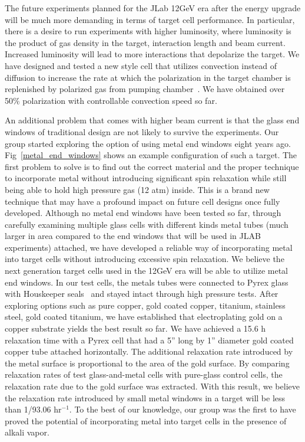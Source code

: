 The future experiments planned for the JLab 12GeV era after the energy upgrade will be much more demanding in terms of target cell performance. In particular, there is a desire to run experiments with higher luminosity, where luminosity is the product of gas density in the target, interaction length and beam current. Increased luminosity will lead to more interactions that depolarize the target. We have designed and tested a new style cell that utilizes convection instead of diffusion to increase the rate at which the polarization in the target chamber is replenished by polarized gas from pumping chamber~\cite{PhysRevC.84.065201}. We have obtained over 50\% polarization with controllable convection speed so far.

An additional problem that comes with higher beam current is that the glass end windows of traditional design are not likely to survive the experiments. Our group started exploring the option of using metal end windows eight years ago. Fig~\ref{metal_end_windows} shows an example configuration of such a target. The first problem to solve is to find out the correct material and the proper technique to incorporate metal without introducing significant spin relaxation while still being able to hold high pressure gas (12 atm) inside. This is a brand new technique that may have a profound impact on future cell designs once fully developed. Although no metal end windows have been tested so far, through carefully examining multiple glass cells with different kinds metal tubes (much larger in area compared to the end windows that will be used in JLAB experiments) attached, we have developed a reliable way of incorporating metal into target cells without introducing excessive spin relaxation. We believe the next generation target cells used in the 12GeV era will be able to utilize metal end windows. In our test cells, the metals tubes were connected to Pyrex glass with Houskeeper seals~\cite{Houskeeper} and stayed intact through high pressure tests. After exploring options such as pure copper, gold coated copper, titanium, stainless steel, gold coated titanium, we have established that electroplating gold on a copper substrate yields the best result so far. We have achieved a 15.6 h relaxation time with a Pyrex cell that had a 5'' long by 1'' diameter gold coated copper tube attached horizontally. The additional relaxation rate introduced by the metal surface is proportional to the area of the gold surface. By comparing relaxation rates of test glass-and-metal cells with pure-glass control cells, the relaxation rate due to the gold surface was extracted. With this result, we believe the relaxation rate introduced by small metal windows in a target will be less than 1/93.06 hr$^{-1}$. To the best of our knowledge, our group was the first to have proved the potential of incorporating metal into target cells in the presence of alkali vapor. 

